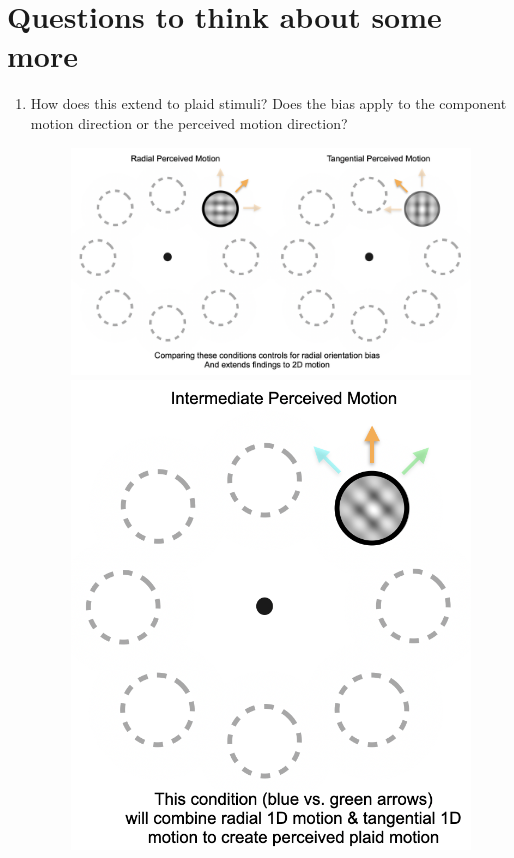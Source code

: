 \documentclass[11pt]{article} %
\begin{document}
\newpage
\section{Questions to think about some more} 
\begin{enumerate}
	\item How does this extend to plaid stimuli? Does the bias apply to the component motion direction or the perceived motion direction?
	\begin{figure}[H]
	\centering %
	\includegraphics[scale=.25]{Images/Cartoon7.png}
	\\
	\includegraphics[scale=.25]{Images/Cartoon8.png}

\end{figure}
\end{enumerate}
\end{document}
